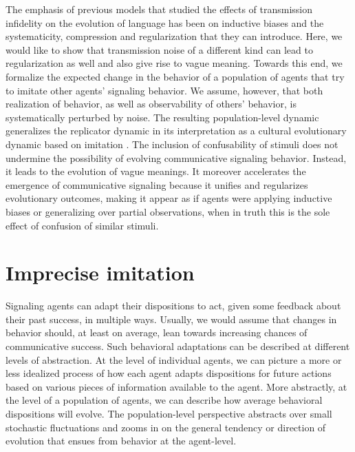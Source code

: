 \documentclass[fleqn,reqno,10pt]{article}
\begin{document}
The emphasis of previous models that studied the effects of transmission infidelity on the
evolution of language has been on inductive biases and the systematicity, compression and
regularization that they can introduce. Here, we would like to show that transmission noise of
a different kind can lead to regularization as well and also give rise to vague
meaning. Towards this end, we formalize the expected change in the behavior of a population of
agents that try to imitate other agents' signaling behavior. We assume, however, that both
realization of behavior, as well as observability of others' behavior, is systematically
perturbed by noise. The resulting population-level dynamic generalizes the replicator dynamic
\citep{TaylorJonker1978:Evolutionary-St} in its interpretation as a cultural evolutionary
dynamic based on imitation
\citep[e.g.][]{Helbing1996:A-Stochastic-Be,Schlag1998:Why-Imitate-and}. The inclusion of
confusability of stimuli does not undermine the possibility of evolving communicative signaling
behavior. Instead, it leads to the evolution of vague meanings. It moreover accelerates the
emergence of communicative signaling because it unifies and regularizes evolutionary outcomes,
making it appear as if agents were applying inductive biases or generalizing over partial
observations, when in truth this is the sole effect of confusion of similar stimuli.




\section{Imprecise imitation}
\label{sec:repl-diff-dynam}

Signaling agents can adapt their dispositions to act, given some feedback about their past
success, in multiple ways. Usually, we would assume that changes in behavior should, at least
on average, lean towards increasing chances of communicative success. Such behavioral
adaptations can be described at different levels of abstraction. At the level of individual
agents, we can picture a more or less idealized process of how each agent adapts dispositions
for future actions based on various pieces of information available to the agent. More
abstractly, at the level of a population of agents, we can describe how average behavioral
dispositions will evolve. The population-level perspective abstracts over small stochastic
fluctuations and zooms in on the general tendency or direction of evolution that ensues from
behavior at the agent-level.
\end{document}
